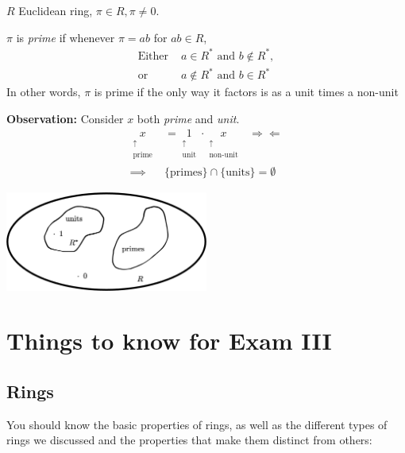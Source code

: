 \begin{definition}[Prime]
    \label{def:prime}
    $R$ Euclidean ring, $\pi \in R, \pi \neq 0$. \\ \steezybreak

    $\pi$ is \textit{prime} if whenever $\pi=ab$ for $ab\in R$, 
    \begin{align*}
        \text{Either } &a\in R^* \text{ and } b \not\in R^*, \\
        \text{or } &a\not\in R^* \text{ and } b\in R^*
    \end{align*}
    In other words, $\pi$ is prime if the only way it factors is as a unit times a non-unit
\end{definition}

\begin{tcolorbox}
    \textbf{Observation:} Consider $x$ both \textit{prime} and \textit{unit}. 
    \begin{align*}
        \underset{\substack{\uparrow \\ \text{prime}}}{x}&= \underset{\substack{\uparrow \\ \text{unit}}}{1}\cdot \underset{\substack{\uparrow \\ \text{non-unit}}}{x} \ \ \ \Rightarrow \Leftarrow \\
        \implies &\{\text{primes}\}\cap \{\text{units}\} = \emptyset
    \end{align*}
    \begin{center}
        \includegraphics[width=0.5\textwidth]{Figures/UnitsAndPrimesAreDistinct.png}
    \end{center}
\end{tcolorbox}
\newpage 
\section*{Things to know for Exam III}
\subsection*{Rings}
You should know the basic properties of rings, as well as the different types of rings we discussed and the properties that make them distinct from others:

